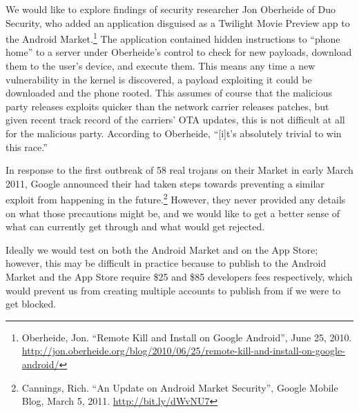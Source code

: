 \documentclass[11pt]{article}
\begin{document}
We would like to explore findings of security researcher Jon Oberheide of Duo Security, who added an application disguised as a Twilight Movie Preview app to the Android Market.\footnote{Oberheide, Jon. ``Remote Kill and Install on Google Android'', June 25, 2010. \url{http://jon.oberheide.org/blog/2010/06/25/remote-kill-and-install-on-google-android/}} The application contained hidden instructions to ``phone home'' to a server under Oberheide's control to check for new payloads, download them to the user's device, and execute them. This means any time a new vulnerability in the kernel is discovered, a payload exploiting it could be downloaded and the phone rooted. This assumes of course that the malicious party releases exploits quicker than the network carrier releases patches, but given recent track record of the carriers' OTA updates, this is not difficult at all for the malicious party. According to Oberheide, ``[i]t's absolutely trivial to win this race.''

In response to the first outbreak of 58 real trojans on their Market in early March 2011, Google announced their had taken steps towards preventing a similar exploit from happening in the future.\footnote{Cannings, Rich. ``An Update on Android Market Security'', Google Mobile Blog, March 5, 2011. \url{http://bit.ly/dWvNU7}} However, they never provided any details on what those precautions might be, and we would like to get a better sense of what can currently get through and what would get rejected.

Ideally we would test on both the Android Market and on the App Store; however, this may be difficult in practice because to publish to the Android Market and the App Store require \$25 and \$85 developers fees respectively, which would prevent us from creating multiple accounts to publish from if we were to get blocked.
\end{document}

